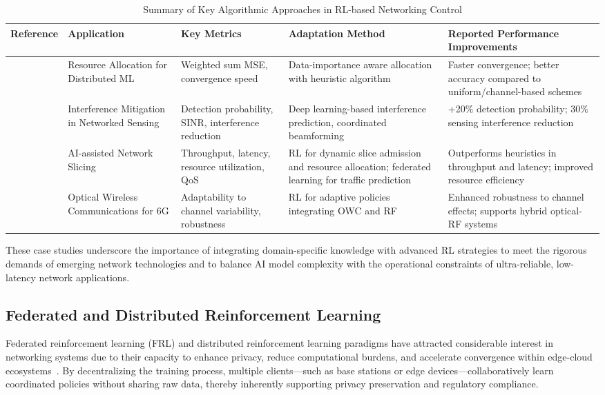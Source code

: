 \documentclass[sigconf]{acmart}
\begin{document}
\begin{table*}[htbp]
\centering
\caption{Summary of Key Algorithmic Approaches in RL-based Networking Control}
\label{tab:alg_summary}
\begin{adjustbox}{max width=\textwidth}
\begin{tabular}{@{}lllll@{}}
\toprule
Reference & Application & Key Metrics & Adaptation Method & Reported Performance Improvements \\ \midrule
\cite{ref3} & Resource Allocation for Distributed ML & Weighted sum MSE, convergence speed & Data-importance aware allocation with heuristic algorithm & Faster convergence; better accuracy compared to uniform/channel-based schemes \\
\cite{ref48} & Interference Mitigation in Networked Sensing & Detection probability, SINR, interference reduction & Deep learning-based interference prediction, coordinated beamforming & +20\% detection probability; 30\% sensing interference reduction \\
\cite{ref6} & AI-assisted Network Slicing & Throughput, latency, resource utilization, QoS & RL for dynamic slice admission and resource allocation; federated learning for traffic prediction & Outperforms heuristics in throughput and latency; improved resource efficiency \\
\cite{ref14} & Optical Wireless Communications for 6G & Adaptability to channel variability, robustness & RL for adaptive policies integrating OWC and RF & Enhanced robustness to channel effects; supports hybrid optical-RF systems \\ \bottomrule
\end{tabular}
\end{adjustbox}
\end{table*}

These case studies underscore the importance of integrating domain-specific knowledge with advanced RL strategies to meet the rigorous demands of emerging network technologies and to balance AI model complexity with the operational constraints of ultra-reliable, low-latency network applications.

\subsection{Federated and Distributed Reinforcement Learning}

Federated reinforcement learning (FRL) and distributed reinforcement learning paradigms have attracted considerable interest in networking systems due to their capacity to enhance privacy, reduce computational burdens, and accelerate convergence within edge-cloud ecosystems~\cite{ref49,ref50}. By decentralizing the training process, multiple clients—such as base stations or edge devices—collaboratively learn coordinated policies without sharing raw data, thereby inherently supporting privacy preservation and regulatory compliance.
\end{document}
